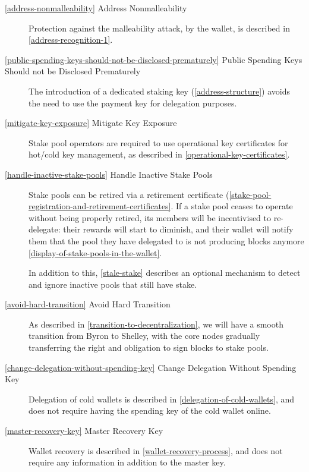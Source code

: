 \documentclass[11pt,a4paper]{article}
\begin{document}
\begin{description}
\item[\cref{address-nonmalleability} Address Nonmalleability] Protection against
  the malleability attack, by the wallet, is described in
  \cref{address-recognition-1}.

\item[\cref{public-spending-keys-should-not-be-disclosed-prematurely}
  Public Spending Keys Should not be Disclosed Prematurely] The
  introduction of a dedicated staking key (\cref{address-structure})
  avoids the need to use the payment key for delegation purposes.

\item[\cref{mitigate-key-exposure} Mitigate Key Exposure] Stake pool operators
  are required to use operational key certificates for hot/cold key management,
  as described in \cref{operational-key-certificates}.

\item[\cref{handle-inactive-stake-pools} Handle Inactive Stake Pools]
  Stake pools can be retired via a retirement certificate
  (\cref{stake-pool-registration-and-retirement-certificates}. If a stake pool
  ceases to operate without being properly retired, its members will be
  incentivised to re-delegate: their rewards will start to diminish, and their
  wallet will notify them that the pool they have delegated to is not producing
  blocks anymore \cref{display-of-stake-pools-in-the-wallet}.

  In addition to this, \cref{stale-stake} describes an optional mechanism to
  detect and ignore inactive pools that still have stake.

\item[\cref{avoid-hard-transition} Avoid Hard Transition] As described
  in \cref{transition-to-decentralization}, we will have a smooth
  transition from Byron to Shelley, with the core nodes gradually
  transferring the right and obligation to sign blocks to stake pools.

\item[\cref{change-delegation-without-spending-key} Change Delegation
  Without Spending Key] Delegation of cold wallets is described in
  \cref{delegation-of-cold-wallets}, and does not require having the
  spending key of the cold wallet online.

\item[\cref{master-recovery-key} Master Recovery Key] Wallet recovery
  is described in \cref{wallet-recovery-process}, and does not require
  any information in addition to the master key.


\end{description}
\end{document}
